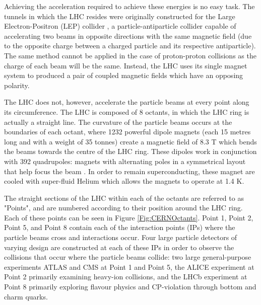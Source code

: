 \documentclass[12pt,a4paper,epsf,portrait,times,epsfig]{article}
\begin{document}
		Achieving the acceleration required to achieve these energies is no easy task. The tunnels in which the LHC resides were originally constructed for the Large Electron-Positron (LEP) collider \cite{LEPHistory, LEPDesign1, LEPDesign2, LEPDesign3}, a particle-antiparticle collider capable of accelerating two beams in opposite directions with the same magnetic field (due to the opposite charge between a charged particle and its respective antiparticle). The same method cannot be applied in the case of proton-proton collisions as the charge of each beam will be the same. Instead, the LHC uses its single magnet system to produced a pair of coupled magnetic fields which have an opposing polarity. \par

		The LHC does not, however, accelerate the particle beams at every point along its circumference. The LHC is composed of 8 octants, in which the LHC ring is actually a straight line. The curvature of the particle beams occurs at the boundaries of each octant, where 1232 powerful dipole magnets (each 15 metres long and with a weight of 35 tonnes) create a magnetic field of 8.3 T which bends the beams towards the centre of the LHC ring. These dipoles work in conjunction with 392 quadrupoles: magnets with alternating poles in a symmetrical layout that help focus the beam \cite{LHCMagnets}. In order to remain superconducting, these magnet are cooled with super-fluid Helium which allows the magnets to operate at 1.4 K. \par

		The straight sections of the LHC within each of the octants are referred to as "Points", and are numbered according to their position around the LHC ring. Each of these points can be seen in Figure \ref{Fig:CERNOctants}. Point 1, Point 2, Point 5, and Point 8 contain each of the interaction points (IPs) where the particle beams cross and interactions occur. Four large particle detectors of varying design are constructed at each of these IPs in order to observe the collisions that occur where the particle beams collide: two large general-purpose experiments ATLAS \cite{ATLAS_Collab} and CMS \cite{CMSCollab} at Point 1 and Point 5, the ALICE \cite{ALICECollab} experiment at Point 2 primarily examining heavy-ion collisions, and the LHCb \cite{LHCCollab} experiment at Point 8 primarily exploring flavour physics and CP-violation through bottom and charm quarks. \par
\end{document}
